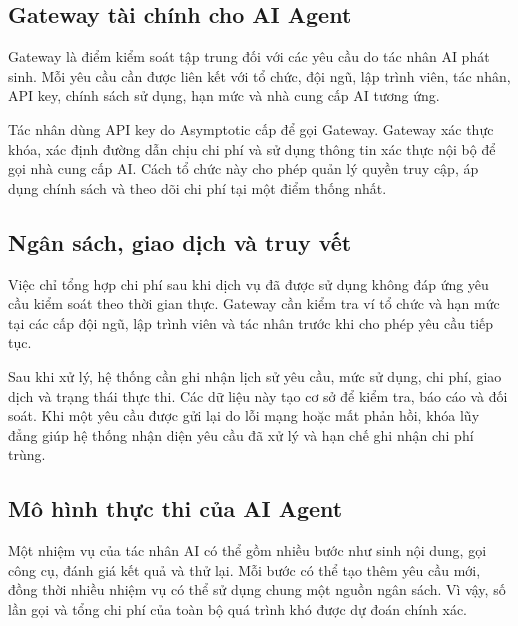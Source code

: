 
\subsection*{Gateway tài chính cho AI Agent}

Gateway là điểm kiểm soát tập trung đối với các yêu cầu do tác nhân AI phát sinh. Mỗi yêu cầu cần được liên kết với tổ chức, đội ngũ, lập trình viên, tác nhân, API key, chính sách sử dụng, hạn mức và nhà cung cấp AI tương ứng.

Tác nhân dùng API key do Asymptotic cấp để gọi Gateway. Gateway xác thực khóa, xác định đường dẫn chịu chi phí và sử dụng thông tin xác thực nội bộ để gọi nhà cung cấp AI. Cách tổ chức này cho phép quản lý quyền truy cập, áp dụng chính sách và theo dõi chi phí tại một điểm thống nhất.


\subsection*{Ngân sách, giao dịch và truy vết}

Việc chỉ tổng hợp chi phí sau khi dịch vụ đã được sử dụng không đáp ứng yêu cầu kiểm soát theo thời gian thực. Gateway cần kiểm tra ví tổ chức và hạn mức tại các cấp đội ngũ, lập trình viên và tác nhân trước khi cho phép yêu cầu tiếp tục.

Sau khi xử lý, hệ thống cần ghi nhận lịch sử yêu cầu, mức sử dụng, chi phí, giao dịch và trạng thái thực thi. Các dữ liệu này tạo cơ sở để kiểm tra, báo cáo và đối soát. Khi một yêu cầu được gửi lại do lỗi mạng hoặc mất phản hồi, khóa lũy đẳng giúp hệ thống nhận diện yêu cầu đã xử lý và hạn chế ghi nhận chi phí trùng.


\subsection*{Mô hình thực thi của AI Agent}

Một nhiệm vụ của tác nhân AI có thể gồm nhiều bước như sinh nội dung, gọi công cụ, đánh giá kết quả và thử lại. Mỗi bước có thể tạo thêm yêu cầu mới, đồng thời nhiều nhiệm vụ có thể sử dụng chung một nguồn ngân sách. Vì vậy, số lần gọi và tổng chi phí của toàn bộ quá trình khó được dự đoán chính xác.

